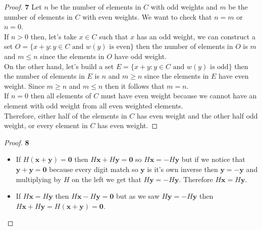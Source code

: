 \documentclass[11pt]{article}
\begin{document}
\cleardoublepage
	\begin{proof}{\textbf{7}}
		Let $n$ be the number of elements in $C$ with odd weights and $m$ be the number of elements in $C$ with even weights. We want to check that $n=m$ or $n=0$.\\
		If $n > 0$ then, let's take $x \in C$ such that $x$ has an odd weight, we can construct a set $O=\{x+y: y \in C \text{ and } w(y) \text{ is even}\}$ then the number of elements in $O$ is $m$  and $m \leq n$ since the elements in $O$ have odd weight.\\
		On the other hand, let's build a set $E = \{x+y: y \in C  \text{ and } w(y) \text{ is odd}\}$ then the number of elements in $E$ is $n$ and $m \geq n$ since the elements in $E$ have even weight. Since $m \geq n$ and $m \leq n$ then it follows that $m=n$.\\
		If $n=0$ then all elements of $C$ must have even weight because we cannot have an element with odd weight from all even weighted elements.\\
		Therefore, either half of the elements in $C$ has even weight and the other half odd weight, or every element in $C$ has even weight.
	\end{proof}
	\begin{proof}{\textbf{8}}
		\begin{itemize}
			\item If $H(\bm{x+y})=\bm{0}$ then $H\bm{x}+H\bm{y}=\bm{0}$ so $H\bm{x}=-H\bm{y}$ but if we notice that $\bm{y+y}=\bm{0}$ because every digit match so $\bm{y}$ is it's own inverse then $\bm{y}=-\bm{y}$ and multiplying by $H$ on the left we get that $H\bm{y}=-H\bm{y}$. Therefore $H\bm{x}=H\bm{y}$.
			\item If $H\bm{x}=H\bm{y}$ then $H\bm{x}-H\bm{y}=\bm{0}$ but as we saw $H\bm{y}=-H\bm{y}$ then $H\bm{x}+H\bm{y}=H(\bm{x+y})=\bm{0}$.
		\end{itemize}
	\end{proof}
\end{document}
